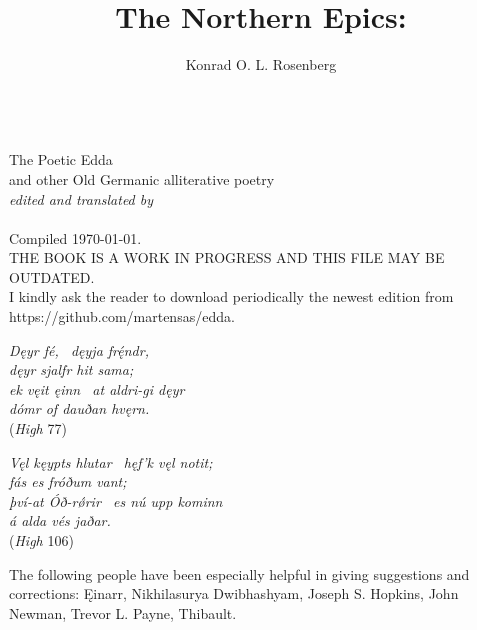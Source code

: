 \title{The Northern Epics:}
\author{Konrad O. L. Rosenberg}

\begin{titlingpage}
  \makeatletter
  \centering
  \HUGE \@title \\
  \Huge The Poetic Edda \\
  \Large and other Old Germanic alliterative poetry \\
  \large\emph{edited and translated by} \\
  \huge \@author \\
  \vspace{5cm}
  \Large Compiled \today. \\
  THE BOOK IS A WORK IN PROGRESS AND THIS FILE MAY BE OUTDATED. \\
  I kindly ask the reader to download periodically the newest edition from https://github.com/martensas/edda.
  \makeatother
\end{titlingpage}

\newpage\thispagestyle{empty}

\begin{center}{\Large \emph{Dęyr fé, \hld\ dęyja frę́ndr, \\
dęyr sjalfr hit sama; \\
ek vęit ęinn \hld\ at aldri-gi dęyr \\
dómr of dauðan hvęrn.}} \\

(\emph{High} 77)\end{center}

\vspace{5mm}

\begin{center}{\Large \emph{Vęl kęypts hlutar \hld\ hęf’k vęl notit; \\
fás es fróðum vant; \\
því-at Óð-rǿrir \hld\ es nú upp kominn \\
á alda vés jaðar.}} \\

(\emph{High} 106)\end{center}

\vspace{2cm}

The following people have been especially helpful in giving suggestions and corrections: Ęinarr, Nikhilasurya Dwibhashyam, Joseph S. Hopkins, John Newman, Trevor L. Payne, Thibault.

\newpage\thispagestyle{empty}

\tableofcontents

